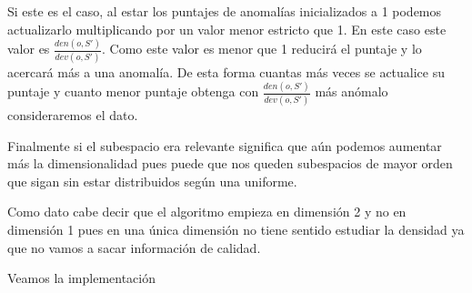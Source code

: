 Si este es el caso, al estar los puntajes de anomalías inicializados a 1 podemos actualizarlo multiplicando por un valor menor estricto que 1. En este caso este valor es $\frac{den(o,S')}{dev(o,S')}$. Como este valor es menor que 1 reducirá el puntaje y lo acercará más a una anomalía. De esta forma cuantas más veces se actualice su puntaje y cuanto menor puntaje obtenga con $\frac{den(o,S')}{dev(o,S')}$ más anómalo consideraremos el dato.

Finalmente si el subespacio era relevante significa que aún podemos aumentar más la dimensionalidad pues puede que nos queden subespacios de mayor orden que sigan sin estar distribuidos según una uniforme.

Como dato cabe decir que el algoritmo empieza en dimensión 2 y no en dimensión 1 pues en una única dimensión no tiene sentido estudiar la densidad ya que no vamos a sacar información de calidad.

Veamos la implementación

